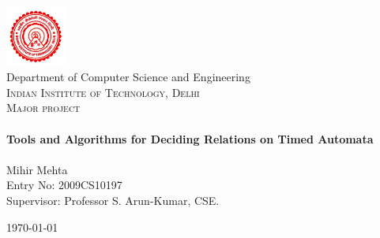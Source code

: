 \begin{titlepage}
 \begin{center}
 
 
\includegraphics[width=0.15\textwidth]{IITD-LOGO.jpg}\\[1cm]
 
{\LARGE Department of Computer Science and Engineering}\\[.5cm]
\textsc{\Large Indian Institute of Technology, Delhi}\\[1.5cm]
 
\textsc{\Large Major project}\\[0.5cm]
 
 
\HRule \\[0.4cm]
{ \Large \bfseries Tools and Algorithms for Deciding Relations on Timed Automata}\\[0.4cm]
 
\HRule \\[1.5cm]
 
{\large Mihir Mehta} \\[.5cm]
{\large Entry No: 2009CS10197} \\[.5cm]
{\large Supervisor: Professor S. Arun-Kumar, CSE.}
\vfill
 
{\large \today}
 
\end{center}

\end{titlepage}
